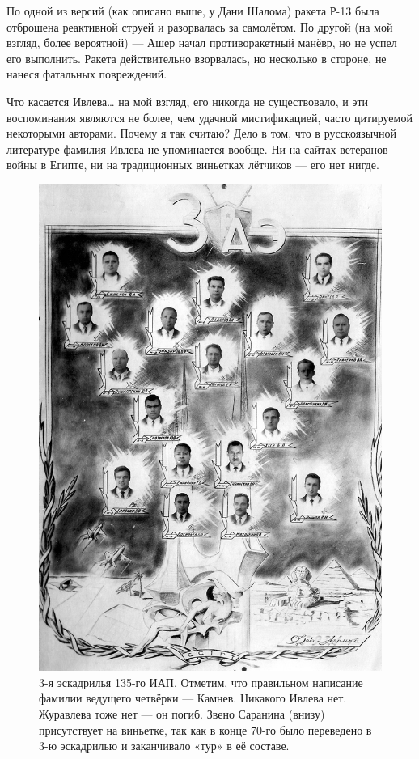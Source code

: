 По одной из версий (как описано выше, у Дани Шалома) ракета Р-13 была отброшена реактивной струей и разорвалась за самолётом. По другой (на мой взгляд, более вероятной) — Ашер начал противоракетный манёвр, но не успел его выполнить. Ракета действительно взорвалась, но несколько в стороне, не нанеся фатальных повреждений.

Что касается Ивлева… на мой взгляд, его никогда не существовало, и эти воспоминания являются не более, чем удачной мистификацией, часто цитируемой некоторыми авторами. Почему я так считаю? Дело в том, что в русскоязычной литературе фамилия Ивлева не упоминается вообще. Ни на сайтах ветеранов войны в Египте, ни на традиционных виньетках лётчиков — его нет нигде. 

\begin{figure}[h!tb] 
	\centering\includegraphics[scale=0.25]{Dolina_5/Nzt1_-t0RiE.jpg}
	\caption{3-я эскадрилья 135-го ИАП. Отметим, что правильном написание фамилии ведущего четвёрки — Камнев. Никакого Ивлева нет. Журавлева тоже нет — он погиб. Звено Саранина (внизу) присутствует на виньетке, так как в конце 70-го было переведено в 3-ю эскадрилью и заканчивало «тур» в её составе.}%
\end{figure}

